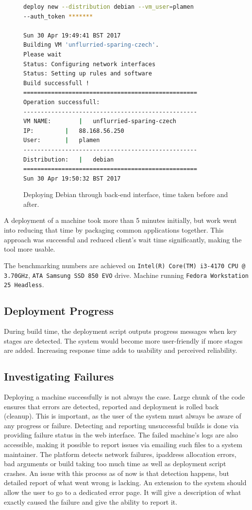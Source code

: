 \documentclass{article}
\begin{document}
\begin{figure}
\begin{lstlisting}[frame=single, language=Bash]
deploy new --distribution debian --vm_user=plamen
--auth_token *******

Sun 30 Apr 19:49:41 BST 2017
Building VM 'unflurried-sparing-czech'.
Please wait
Status: Configuring network interfaces
Status: Setting up rules and software
Build successfull !
==================================================
Operation successfull:
--------------------------------------------------
VM NAME:		|	unflurried-sparing-czech
IP:			|	88.168.56.250
User:		|	plamen
--------------------------------------------------
Distribution:	|	debian
==================================================
Sun 30 Apr 19:50:32 BST 2017
\end{lstlisting}
\caption{Deploying Debian through back-end interface, time taken before and after.}
\label{fig:deeploy-debian-output}
\end{figure}

A deployment of a machine took more than 5 minutes initially, but work went into reducing that time by packaging common applications together. This approach was successful and reduced client's wait time significantly, making the tool more usable.

The benchmarking numbers are achieved on \texttt{Intel(R) Core(TM) i3-4170 CPU @ 3.70GHz}, \texttt{ATA Samsung SSD 850 EVO} drive. Machine running \texttt{Fedora Workstation 25 Headless}.

\subsection{Deployment Progress}
During build time, the deployment script outputs progress messages when key stages are detected. The system would become more user-friendly if more stages are added. Increasing response time adds to usability and perceived reliability.

\subsection{Investigating Failures}
Deploying a machine successfully is not always the case. Large chunk of the code ensures that errors are detected, reported and deployment is rolled back (cleanup). This is important, as the user of the system must always be aware of any progress or failure.
Detecting and reporting unsuccessful builds is done via providing failure status in the web interface. The failed machine's logs are also accessible, making it possible to report issues via emailing such files to a system maintainer. The platform detects network failures, \gls{ipaddress} allocation errors, bad arguments or build taking too much time as well as deployment script crashes.
An issue with this process as of now is that detection happens, but detailed report of what went wrong is lacking. An extension to the system should allow the user to go to a dedicated error page. It will give a description of what exactly caused the failure and give the ability to report it.
\end{document}
